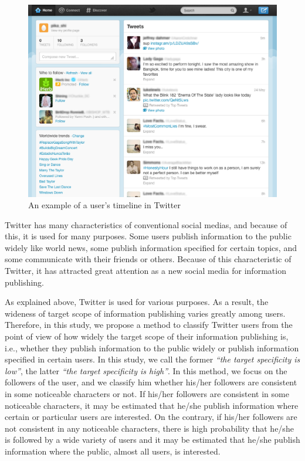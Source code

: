 {\footnotesize
\begin{figure}[t]
\begin{center}
\includegraphics[width=14cm]{images/screen_shot.eps}
 \caption{An example of a user's timeline in Twitter}
\label{fig:twitter}
\end{center}
\end{figure}
}

Twitter has many characteristics of conventional social medias, and
because of this, it is used for many purposes.  Some users publish
information to the public widely like world news, some publish
information specified for certain topics, and some communicate with
their friends or others.  Because of this characteristic of Twitter, it
has attracted great attention as a new social media for information
publishing.

As explained above, Twitter is used for various purposes.  As a result,
the wideness of target scope of information publishing varies greatly
among users.  Therefore, in this study, we propose a method to classify
Twitter users from the point of view of how widely the target scope of
their information publishing is, i.e., whether they publish information
to the public widely or publish information specified in certain users.
In this study, we call the former \emph{``the target specificity is
low''}, the latter \emph{``the target specificity is high''}. In this
method, we focus on the followers of the user, and we classify him
whether his/her followers are consistent in some noticeable characters
or not.  If his/her followers are consistent in some noticeable
characters, it may be estimated that he/she publish information where
certain or particular users are interested. On the contrary, if his/her
followers are not consistent in any noticeable characters, there is high
probability that he/she is followed by a wide variety of users and it
may be estimated that he/she publish information where the public,
almost all users, is interested.

